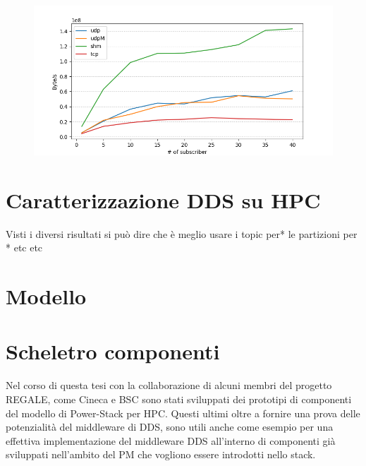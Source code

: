 \begin{figure}[H]
    \includegraphics[width=\textwidth]{./results/test3_graph_throughput.png} 
    \caption{} %
    \label{}
\end{figure}

\section{Caratterizzazione DDS su HPC}
Visti i diversi risultati si può dire che è meglio usare i topic per* le partizioni per *
etc etc
\section{Modello}




\section{Scheletro componenti}
Nel corso di questa tesi con la collaborazione di alcuni membri del progetto REGALE, come Cineca\cite{TODO} e BSC\cite{TODO} sono stati sviluppati dei prototipi di componenti del modello di Power-Stack per HPC.
Questi ultimi oltre a fornire una prova delle potenzialità del middleware di DDS, sono utili anche come esempio per una effettiva implementazione del middleware DDS all'interno di componenti già sviluppati nell'ambito del PM che vogliono essere introdotti nello stack.



